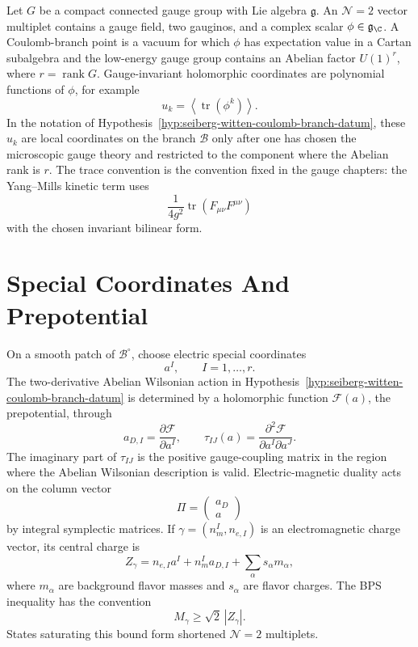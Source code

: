 Let \(G\) be a compact connected gauge group with Lie algebra \(\mathfrak g\).
An \(\mathcal N=2\) vector multiplet contains a gauge field, two gauginos, and
a complex scalar \(\phi\in\mathfrak g_{\C}\).  A Coulomb-branch point is a
vacuum for which \(\phi\) has expectation value in a Cartan subalgebra and
the low-energy gauge group contains an Abelian factor \(U(1)^r\), where
\(r=\operatorname{rank}G\).  Gauge-invariant holomorphic coordinates are
polynomial functions of \(\phi\), for example
\[
  u_k=\left\langle \operatorname{tr}(\phi^k)\right\rangle .
\]
In the notation of Hypothesis~\ref{hyp:seiberg-witten-coulomb-branch-datum},
these \(u_k\) are local coordinates on the branch \(\mathcal B\) only after
one has chosen the microscopic gauge theory and restricted to the component
where the Abelian rank is \(r\).
The trace convention is the convention fixed in the gauge chapters: the
Yang--Mills kinetic term uses
\[
  \frac{1}{4g^2}\operatorname{tr}(F_{\mu\nu}F^{\mu\nu})
\]
with the chosen invariant bilinear form.

\section{Special Coordinates And Prepotential}

On a smooth patch of \(\mathcal B^\circ\), choose electric special coordinates
\[
  a^I,\qquad I=1,\ldots,r .
\]
The two-derivative Abelian Wilsonian action in
Hypothesis~\ref{hyp:seiberg-witten-coulomb-branch-datum} is determined by a
holomorphic function \(\mathcal F(a)\), the prepotential, through
\[
  a_{D,I}=\frac{\partial\mathcal F}{\partial a^I},
  \qquad
  \tau_{IJ}(a)=\frac{\partial^2\mathcal F}{\partial a^I\partial a^J}.
\]
The imaginary part of \(\tau_{IJ}\) is the positive gauge-coupling matrix in
the region where the Abelian Wilsonian description is valid.  Electric-magnetic
duality acts on the column vector
\[
  \Pi=\begin{pmatrix} a_D \\ a \end{pmatrix}
\]
by integral symplectic matrices.  If \(\gamma=(n_m^I,n_{e,I})\) is an
electromagnetic charge vector, its central charge is
\[
  Z_\gamma=n_{e,I}a^I+n_m^I a_{D,I}+\sum_\alpha s_\alpha m_\alpha ,
\]
where \(m_\alpha\) are background flavor masses and \(s_\alpha\) are flavor
charges.  The BPS inequality has the convention
\[
  M_\gamma\geq \sqrt2\,|Z_\gamma|.
\]
States saturating this bound form shortened \(\mathcal N=2\) multiplets.

